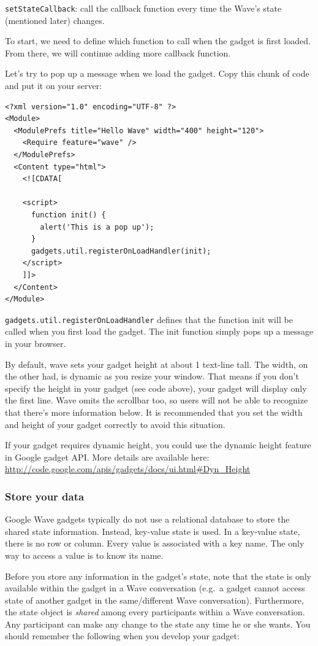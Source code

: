 {\tt setStateCallback}: call the callback function every time the
Wave's state (mentioned later) changes.

To start, we need to define which function to call when the gadget
is first loaded.  From there, we will continue adding more callback
function.

Let's try to pop up a message when we load the gadget. Copy this chunk
of code and put it on your server:

\begin{verbatim}
<?xml version="1.0" encoding="UTF-8" ?>
<Module>
  <ModulePrefs title="Hello Wave" width="400" height="120">
    <Require feature="wave" /> 
  </ModulePrefs>
  <Content type="html">
    <![CDATA[     

    <script>
      function init() {
        alert('This is a pop up');
      }
      gadgets.util.registerOnLoadHandler(init);
    </script>
    ]]>
  </Content>
</Module>
\end{verbatim}

{\tt gadgets.util.registerOnLoadHandler} defines that the function
init will be called when you first load the gadget. The init function
simply pops up a message in your browser.

By default, wave sets your gadget height at about 1 text-line tall. The width, on the other had, is dynamic as you resize your window. That means if you
don't specify the height in your gadget (see code above), your gadget
will display only the first line.  Wave omits the scrollbar too, so
users will not be able to recognize that there's more information
below. It is recommended that you set the width and height of your
gadget correctly to avoid this situation.

If your gadget requires dynamic height, you could use the dynamic
height feature in Google gadget API. More details are available here:
\url{http://code.google.com/apis/gadgets/docs/ui.html#Dyn_Height}

\subsubsection{Store your data}

Google Wave gadgets typically do not use a relational database to
store the shared state information. Instead, key-value state
is used. In a key-value state, there is no row or column. Every value
is associated with a key name. The only way to access a value is to
know its name.

Before you store any information in the gadget's state, note that the
state is only available within the gadget in a Wave conversation
(e.g.\ a gadget cannot access state of another gadget in the
same/different Wave conversation). Furthermore, the state object is
{\em shared} among every participants within a Wave conversation. Any
participant can make any change to the state any time he or she
wants. You should remember the following when you develop your gadget:

